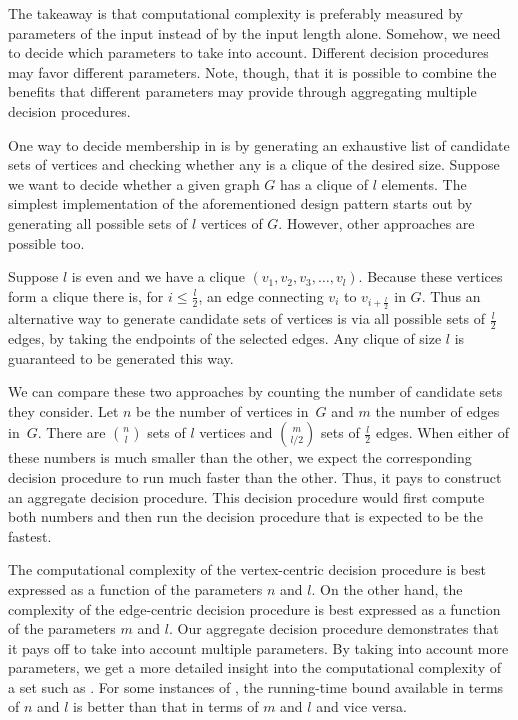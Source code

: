 The takeaway is that computational complexity is preferably measured by parameters of the input instead of by the input length alone.
Somehow, we need to decide which parameters to take into account.
Different decision procedures may favor different parameters.
Note, though, that it is possible to combine the benefits that different parameters may provide through aggregating multiple decision procedures.

\begin{example}
  One way to decide membership in  is by generating an exhaustive list of candidate sets of vertices and checking whether any is a clique of the desired size.
  Suppose we want to decide whether a given graph $G$ has a clique of $l$ elements.
  The simplest implementation of the aforementioned design pattern starts out by generating all possible sets of $l$ vertices of $G$.
  However, other approaches are possible too.

  Suppose $l$ is even and we have a clique $(v_1, v_2, v_3, \ldots, v_l)$.
  Because these vertices form a clique there is, for $i \le \frac{l}{2}$, an edge connecting $v_i$ to $v_{i + \frac{l}{2}}$ in $G$.
  Thus an alternative way to generate candidate sets of vertices is via all possible sets of $\frac{l}{2}$ edges, by taking the endpoints of the selected edges.
  Any clique of size $l$ is guaranteed to be generated this way.

  We can compare these two approaches by counting the number of candidate sets they consider.
  Let $n$ be the number of vertices in~$G$ and $m$ the number of edges in~$G$.
  There are $\binom{n}{l}$ sets of $l$ vertices and $\binom{m}{l / 2}$ sets of $\frac{l}{2}$ edges.
  When either of these numbers is much smaller than the other, we expect the corresponding decision procedure to run much faster than the other.
  Thus, it pays to construct an aggregate decision procedure.
  This decision procedure would first compute both numbers and then run the decision procedure that is expected to be the fastest.

  The computational complexity of the vertex-centric decision procedure is best expressed as a function of the parameters $n$ and $l$.
  On the other hand, the complexity of the edge-centric decision procedure is best expressed as a function of the parameters $m$ and $l$.
  Our aggregate decision procedure demonstrates that it pays off to take into account multiple parameters.
  By taking into account more parameters, we get a more detailed insight into the computational complexity of a set such as .
  For some instances of , the running-time bound available in terms of $n$ and $l$ is better than that in terms of $m$ and $l$ and vice versa.
\end{example}

